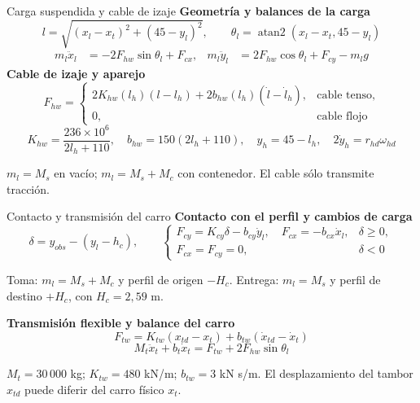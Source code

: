\documentclass[aspectratio=169,11pt]{beamer}
\newcommand{\figcaption}[1]{{\fontsize{8}{9.5}\selectfont\textcolor{muted}{#1}\par}}
\begin{document}
\begin{frame}[t,label=slide8]{Carga suspendida y cable de izaje}
\vspace*{-3mm}
\small\setlength{\abovedisplayskip}{4pt}\setlength{\belowdisplayskip}{1pt}
\textbf{Geometría y balances de la carga}
\[
l=\sqrt{(x_l-x_t)^2+(45-y_l)^2},\qquad
\theta_l=\operatorname{atan2}(x_l-x_t,45-y_l)
\]
\[
\begin{aligned}
m_l\ddot x_l&=-2F_{hw}\sin\theta_l+F_{cx},&
m_l\ddot y_l&=2F_{hw}\cos\theta_l+F_{cy}-m_lg
\end{aligned}
\]
\textbf{Cable de izaje y aparejo}
\[
F_{hw}=\begin{cases}
2K_{hw}(l_h)(l-l_h)+2b_{hw}(l_h)(\dot l-\dot l_h),&\text{cable tenso},\\
0,&\text{cable flojo}
\end{cases}
\]
\[
K_{hw}=\frac{236\times10^6}{2l_h+110},\quad b_{hw}=150(2l_h+110),\quad
y_h=45-l_h,\quad 2\dot y_h=r_{hd}\omega_{hd}
\]
\figcaption{$m_l=M_s$ en vacío; $m_l=M_s+M_c$ con contenedor. El cable sólo transmite tracción.}
\end{frame}
\begin{frame}[t,label=slide10]{Contacto y transmisión del carro}
\small\setlength{\abovedisplayskip}{5pt}\setlength{\belowdisplayskip}{5pt}
\textbf{Contacto con el perfil y cambios de carga}
\[
\delta=y_{obs}-(y_l-h_c),\qquad
\begin{cases}
F_{cy}=K_{cy}\delta-b_{cy}\dot y_l,\quad F_{cx}=-b_{cx}\dot x_l,&\delta\geq0,\\
F_{cx}=F_{cy}=0,&\delta<0
\end{cases}
\]
\figcaption{Toma: $m_l=M_s+M_c$ y perfil de origen $-H_c$. Entrega: $m_l=M_s$ y perfil de destino $+H_c$, con $H_c=2,59$ m.}
\vspace{3mm}\textbf{Transmisión flexible y balance del carro}
\[
F_{tw}=K_{tw}(x_{td}-x_t)+b_{tw}(\dot x_{td}-\dot x_t)
\]
\[
M_t\ddot x_t+b_t\dot x_t=F_{tw}+2F_{hw}\sin\theta_l
\]
\figcaption{$M_t=30\,000$ kg; $K_{tw}=480$ kN/m; $b_{tw}=3$ kN s/m. El desplazamiento del tambor $x_{td}$ puede diferir del carro físico $x_t$.}
\end{frame}
\end{document}

